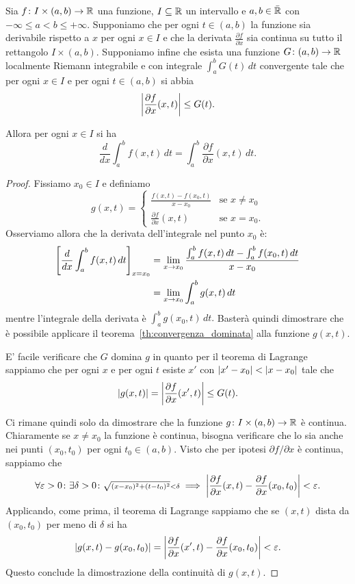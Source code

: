 \begin{theorem}%
  \mymark{**}%
  \label{th:derivata_integrale}%
%
Sia $f\colon I\times(a,b)\to {\mathbb R}$ una funzione, $I\subseteq {\mathbb R}$ 
un intervallo e $a,b\in \bar{{\mathbb R}}$ con $-\infty \le a < b \le +\infty$.
Supponiamo che per ogni $t\in (a,b)$ la funzione sia derivabile rispetto a $x$
per ogni $x\in I$
e che la derivata $\frac{\partial f}{\partial x}$ sia continua su tutto il rettangolo 
$I\times(a,b)$.
Supponiamo infine che esista una funzione $G\colon(a,b)\to {\mathbb R}$ localmente Riemann integrabile 
e con integrale $\int_a^b G(t)\, dt$ convergente tale che per ogni $x\in I$ 
e per ogni $t\in (a,b)$ si abbia 
\[
  {\left|\frac{\partial f}{\partial x}(x,t)\right|} \le G(t).
\]

Allora per ogni $x\in I$ si ha
\[
  \frac{d}{dx} \int_a^b f(x,t)\, dt = \int_a^b \frac{\partial f}{\partial x}(x,t)\, dt.  
\]
\end{theorem}
%
\begin{proof}
Fissiamo $x_0\in I$ e definiamo 
\[
 g(x,t) = \begin{cases}
 \frac{f(x,t) - f(x_0,t)}{x-x_0} &\text{se $x\neq x_0$}\\
 \frac{\partial f}{\partial x}(x,t) & \text{se $x = x_0$}.
\end{cases}  
\]
Osserviamo allora che la derivata dell'integrale nel punto $x_0$ 
è:
\begin{align*}
    {\left[ \frac{d}{dx} \int_a^b f(x,t)\, dt \right]}_{x=x_0}
  &= \lim_{x\to x_0} \frac{\int_a^b f(x,t)\, dt - \int_a^b f(x_0,t)\, dt }{x-x_0}\\
  &= \lim_{x\to x_0} \int_a^b g(x,t)\, dt  
\end{align*}
mentre l'integrale della derivata è 
$\int_a^b g(x_0,t)\, dt.$
Basterà quindi dimostrare che è possibile applicare il teorema~\ref{th:convergenza_dominata}
alla funzione $g(x,t)$.

E' facile verificare che $G$ domina $g$ in quanto per il teorema di Lagrange sappiamo 
che per ogni $x$ e per ogni $t$ esiste $x'$ con ${\left|x'-x_0\right|}<{\left|x-x_0\right|}$ tale che 
\[
  {\left|g(x,t)\right|} = {\left|\frac{\partial f}{\partial x}(x',t)\right|} \le G(t).
\]

Ci rimane quindi solo da dimostrare che la funzione $g\colon I\times (a,b)\to {\mathbb R}$ 
è continua. 
Chiaramente se $x\neq x_0$ la funzione è continua, bisogna verificare che lo 
sia anche nei punti $(x_0,t_0)$ per ogni $t_0\in (a,b)$. 
Visto che per ipotesi $\partial f / \partial x$ è continua, sappiamo 
che 
\[
  \forall \varepsilon>0 \colon \exists \delta>0\colon 
  {\scriptstyle\sqrt{(x-x_0)^2+(t-t_0)^2}<\delta} 
  \implies {\left|\frac{\partial f}{\partial x}(x,t) - \frac{\partial f}{\partial x}(x_0,t_0)\right|}<\varepsilon.
\]
Applicando, come prima, il teorema di Lagrange sappiamo che se $(x,t)$ dista da $(x_0,t_0)$
per meno di $\delta$ si ha 
\[
{\left|g(x,t) - g(x_0,t_0)\right|} 
= {\left|\frac{\partial f}{\partial x}(x',t) - \frac{\partial f}{\partial x}(x_0,t_0)\right|}
 < \varepsilon.
\]
Questo conclude la dimostrazione della continuità di $g(x,t)$.
\end{proof}


